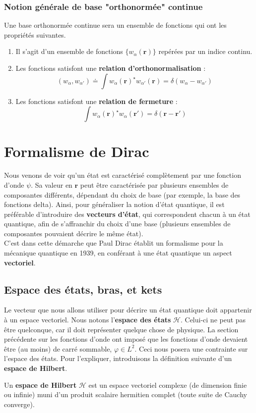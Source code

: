 \documentclass[../notesdecours.tex]{subfiles}
\begin{document}
\subsubsection{Notion générale de base "orthonormée" continue}
Une base orthonormée continue sera un ensemble de fonctions qui ont les propriétés suivantes.
\begin{enumerate}
\item Il s'agit d'un ensemble de fonctions $\{ w_\alpha(\bm{r})\}$ repérées par un indice continu. \\

\item Les fonctions satisfont une \textbf{relation d'orthonormalisation} :
$$(w_{\alpha}, w_{\alpha'}) \doteq \int w_{\alpha}(\bm{r})^\star w_{\alpha'}(\bm{r}) = \delta(w_{\alpha} - w_{\alpha'})$$

\item Les fonctions satisfont une \textbf{relation de fermeture} :
$$\int w_{\alpha}(\bm{r})^\star w_{\alpha}(\bm{r}') = \delta(\bm{r}-\bm{r}')$$
\end{enumerate}
\section{Formalisme de Dirac}
Nous venons de voir qu'un état est caractérisé complètement par une fonction d'onde $\psi$. Sa valeur en $\bm{r}$ peut être caractérisée par plusieurs ensembles de composantes différents, dépendant du choix de base (par exemple, la base des fonctions delta). Ainsi, pour généraliser la notion d'état quantique, il est préférable d'introduire des \textbf{vecteurs d'état}, qui correspondent chacun à un état quantique, afin de s'affranchir du choix d'une base (plusieurs ensembles de composantes pouvaient décrire le même état). \\

C'est dans cette démarche que Paul Dirac établit un formalisme pour la mécanique quantique en 1939, en conférant à une état quantique un aspect \textbf{vectoriel}. 
\subsection{Espace des états, bras, et kets}
Le vecteur que nous allons utiliser pour décrire un état quantique doit appartenir à un espace vectoriel. Nous notons l'\textbf{espace des états} $\mathcal{H}$. Celui-ci ne peut pas être quelconque, car il doit représenter quelque chose de physique. La section précédente sur les fonctions d'onde ont imposé que les fonctions d'onde devaient être (au moins) de carré sommable, $\varphi \in L^2$. Ceci nous posera une contrainte sur l'espace des états. Pour l'expliquer, introduisons la définition suivante d'un \textbf{espace de Hilbert}.
\begin{definition}
	Un \textbf{espace de Hilbert} $\mathcal{H}$ est un espace vectoriel complexe (de dimension finie ou infinie) muni d'un produit scalaire hermitien complet (toute suite de Cauchy converge).
\end{definition}
\end{document}
